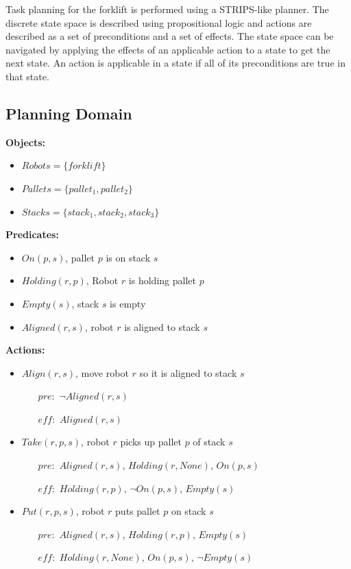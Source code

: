 \documentclass[letterpaper, 10 pt, conference]{ieeeconf}  %
\begin{document}
Task planning for the forklift is performed using a STRIPS-like planner. The discrete state space is described using propositional logic and actions are described as a set of preconditions and a set of effects. The state space can be navigated by applying the effects of an applicable action to a state to get the next state. An action is applicable in a state if all of its preconditions are true in that state.
 
\subsection{Planning Domain}

\noindent\textbf{Objects:}
\begin{itemize}
  \item $Robots = \{forklift\}$
  \item $Pallets = \{pallet_1, pallet_2\}$
  \item $Stacks = \{stack_1, stack_2, stack_3\}$
\end{itemize}

\noindent\textbf{Predicates:}
\begin{itemize}
  \item $On(p, s)$, pallet $p$ is on stack $s$
  \item $Holding(r, p)$, Robot $r$ is holding pallet $p$
  \item $Empty(s)$, stack $s$ is empty
  \item $Aligned(r, s)$, robot $r$ is aligned to stack $s$
\end{itemize}

\noindent\textbf{Actions:}
\begin{itemize}
  \item $Align(r, s)$, move robot $r$ so it is aligned to stack $s$
  \begin{itemize}
  	\item[$pre:$] $\neg Aligned(r, s)$
  	\item[$eff:$] $Aligned(r, s)$
  \end{itemize}

  \item $Take(r, p, s)$, robot $r$ picks up pallet $p$ of stack $s$
  \begin{itemize}
  	\item[$pre:$] $Aligned(r, s)$, $Holding(r, None)$, $On(p, s)$
  	\item[$eff:$] $Holding(r, p)$, $\neg On(p, s)$, $Empty(s)$
  \end{itemize}

  \item $Put(r, p, s)$, robot $r$ puts pallet $p$ on stack $s$
  \begin{itemize}
  	\item[$pre:$] $Aligned(r, s)$, $Holding(r, p)$, $Empty(s)$
  	\item[$eff:$] $Holding(r, None)$, $On(p, s)$, $\neg Empty(s)$
  \end{itemize}
\end{itemize}
\end{document}
